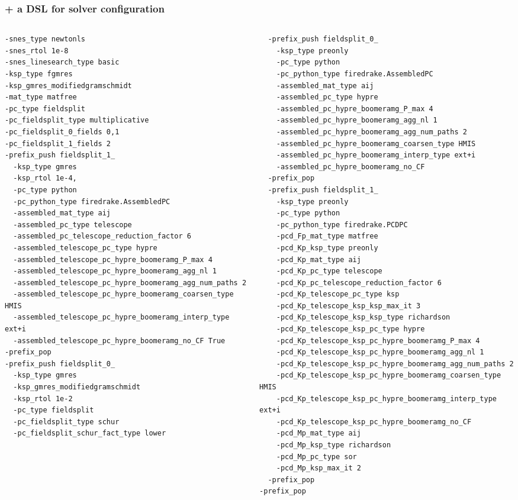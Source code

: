 \documentclass[presentation]{beamer}
\begin{document}
\begin{frame}[fragile]
  \frametitle{ + a DSL for solver configuration}
  \begin{columns}
    \begin{column}{0.5\textwidth}
      {\fontsize{4.5}{4.5}\selectfont
\begin{verbatim}
-snes_type newtonls
-snes_rtol 1e-8
-snes_linesearch_type basic
-ksp_type fgmres
-ksp_gmres_modifiedgramschmidt
-mat_type matfree
-pc_type fieldsplit
-pc_fieldsplit_type multiplicative
-pc_fieldsplit_0_fields 0,1
-pc_fieldsplit_1_fields 2
-prefix_push fieldsplit_1_
  -ksp_type gmres
  -ksp_rtol 1e-4,
  -pc_type python
  -pc_python_type firedrake.AssembledPC
  -assembled_mat_type aij
  -assembled_pc_type telescope
  -assembled_pc_telescope_reduction_factor 6
  -assembled_telescope_pc_type hypre
  -assembled_telescope_pc_hypre_boomeramg_P_max 4
  -assembled_telescope_pc_hypre_boomeramg_agg_nl 1
  -assembled_telescope_pc_hypre_boomeramg_agg_num_paths 2
  -assembled_telescope_pc_hypre_boomeramg_coarsen_type HMIS
  -assembled_telescope_pc_hypre_boomeramg_interp_type ext+i
  -assembled_telescope_pc_hypre_boomeramg_no_CF True
-prefix_pop
-prefix_push fieldsplit_0_
  -ksp_type gmres
  -ksp_gmres_modifiedgramschmidt
  -ksp_rtol 1e-2
  -pc_type fieldsplit
  -pc_fieldsplit_type schur
  -pc_fieldsplit_schur_fact_type lower
\end{verbatim}
        }
      \end{column}
      \begin{column}{0.5\textwidth}
        {\fontsize{4.5}{4.5}\selectfont
\begin{verbatim}
  -prefix_push fieldsplit_0_
    -ksp_type preonly
    -pc_type python
    -pc_python_type firedrake.AssembledPC
    -assembled_mat_type aij
    -assembled_pc_type hypre
    -assembled_pc_hypre_boomeramg_P_max 4
    -assembled_pc_hypre_boomeramg_agg_nl 1
    -assembled_pc_hypre_boomeramg_agg_num_paths 2
    -assembled_pc_hypre_boomeramg_coarsen_type HMIS
    -assembled_pc_hypre_boomeramg_interp_type ext+i
    -assembled_pc_hypre_boomeramg_no_CF
  -prefix_pop
  -prefix_push fieldsplit_1_
    -ksp_type preonly
    -pc_type python
    -pc_python_type firedrake.PCDPC
    -pcd_Fp_mat_type matfree
    -pcd_Kp_ksp_type preonly
    -pcd_Kp_mat_type aij
    -pcd_Kp_pc_type telescope
    -pcd_Kp_pc_telescope_reduction_factor 6
    -pcd_Kp_telescope_pc_type ksp
    -pcd_Kp_telescope_ksp_ksp_max_it 3
    -pcd_Kp_telescope_ksp_ksp_type richardson
    -pcd_Kp_telescope_ksp_pc_type hypre
    -pcd_Kp_telescope_ksp_pc_hypre_boomeramg_P_max 4
    -pcd_Kp_telescope_ksp_pc_hypre_boomeramg_agg_nl 1
    -pcd_Kp_telescope_ksp_pc_hypre_boomeramg_agg_num_paths 2
    -pcd_Kp_telescope_ksp_pc_hypre_boomeramg_coarsen_type HMIS
    -pcd_Kp_telescope_ksp_pc_hypre_boomeramg_interp_type ext+i
    -pcd_Kp_telescope_ksp_pc_hypre_boomeramg_no_CF
    -pcd_Mp_mat_type aij
    -pcd_Mp_ksp_type richardson
    -pcd_Mp_pc_type sor
    -pcd_Mp_ksp_max_it 2
  -prefix_pop
-prefix_pop
\end{verbatim}
}
      \end{column}
  \end{columns}
\end{frame}
\end{document}
